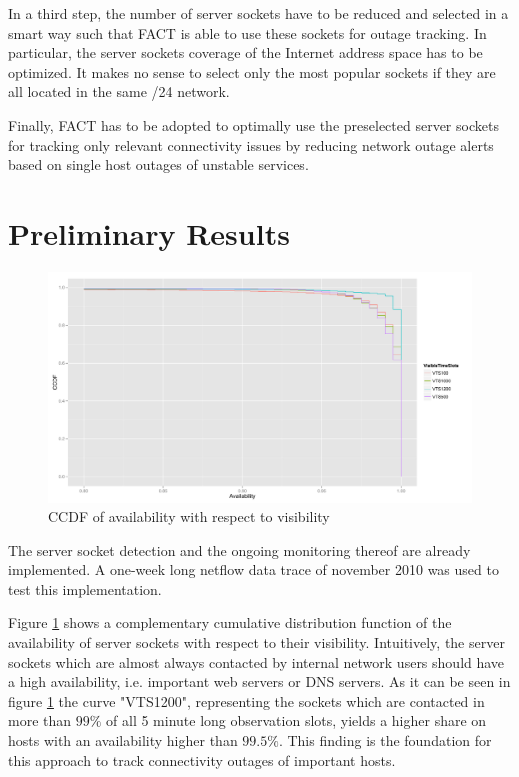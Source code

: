 \documentclass{sigcomm-alternate}
\begin{document}
In a third step, the number of server sockets have to be reduced and
selected in a smart way such that FACT is able to use these sockets
for outage tracking. In particular, the server sockets coverage of the
Internet address space has to be optimized. It makes no sense to select
only the most popular sockets if they are all located in the same /24
network.

Finally, FACT has to be adopted to optimally use the preselected server
sockets for tracking only relevant connectivity issues by reducing
network outage alerts based on single host outages of unstable services.

\section{Preliminary Results} \begin{figure}[ht!]
\centering \includegraphics[width=18cm]{images/RATIO_VTS_External.pdf}
\caption{CCDF of availability with respect to visibility}
\label{fig:RatioVTS} \end{figure} The server socket detection and
the ongoing monitoring thereof are already implemented. A one-week
long netflow data trace of november 2010 was used to test this
implementation.

Figure \ref{fig:RatioVTS} shows a complementary cumulative distribution
function of the availability of server sockets with respect to their
visibility. Intuitively, the server sockets which are almost always
contacted by internal network users should have a high availability,
i.e. important web servers or DNS servers. As it can be seen in
figure \ref{fig:RatioVTS} the curve "VTS1200", representing the
sockets which are contacted in more than $99\%$ of all 5 minute
long observation slots, yields a higher share on hosts with an
availability higher than $99.5\%$. This finding is the foundation
for this approach to track connectivity outages of important hosts.
\end{document}
